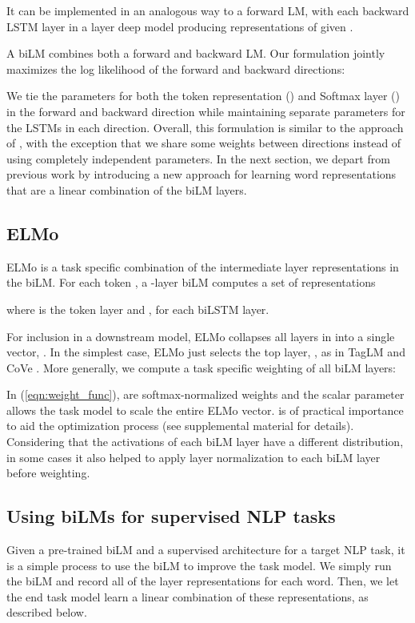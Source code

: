 \documentclass[11pt,a4paper]{article}
\newcommand{\ELMO}{ELMo}
\begin{document}
It can be implemented in an analogous way to a forward LM, with each backward LSTM layer  in a  layer deep model producing
representations  of  given .

A biLM combines both a forward and backward LM.  Our formulation jointly maximizes the log likelihood of the forward and backward directions:

We tie the parameters for both the token representation () and Softmax layer () in the forward and backward
direction while maintaining separate parameters for the LSTMs in each direction.  Overall, this formulation is similar to the approach
of \citet{Peters2017SemisupervisedST}, with the exception that we share some weights between directions instead of using completely independent parameters. In the next section, we depart from previous work by introducing a new approach for learning word representations that are a linear combination of the biLM layers.

\subsection{\ELMO{}}
\label{sec:compute_elmo}
\ELMO{} is a task specific combination of the intermediate layer representations in the biLM.
For each token , a -layer biLM computes a set of  representations

where  is the token layer and , for each biLSTM layer.


For inclusion in a downstream model, \ELMO{} collapses all layers in  into a single vector, .
In the simplest case, \ELMO{} just selects the top layer, , as in TagLM \citep{Peters2017SemisupervisedST} and CoVe \citep{McCann2017LearnedIT}.
More generally, we compute a task specific weighting of all biLM layers:

In (\ref{eqn:weight_func}),  are softmax-normalized weights and the scalar parameter  allows the task model to scale the entire \ELMO{} vector.   is of practical importance to aid the optimization process (see supplemental material for details).
Considering that the activations of each biLM layer have a different distribution, in some cases it also helped to apply layer normalization \citep{Ba2016LayerN} to each biLM layer before weighting.


\subsection{Using biLMs for supervised NLP tasks}
\label{sec:using_bilm}
Given a pre-trained biLM and a supervised architecture for a target NLP task, it is a simple process to use the biLM to improve the task model.
We simply run the biLM and record all of the layer representations for each word.  Then, we let the end task model learn a linear combination of these representations, as described below. 
\end{document}
